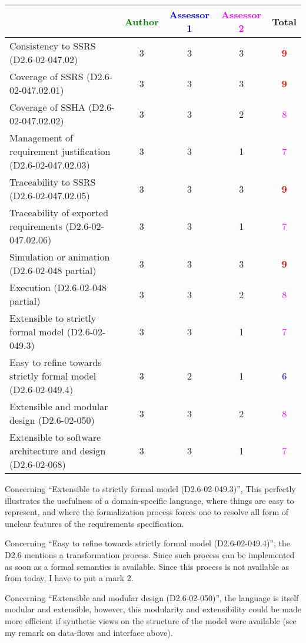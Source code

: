 \begin{tabular}{|l | c | c | c | c|}
\hline
& \textcolor{green}{Author} & \textcolor{blue}{Assessor 1} & \textcolor{magenta}{Assessor 2} & Total \\
\hline 
Consistency to SSRS (D2.6-02-047.02) & 3     & 3     & 3     & \textcolor{red}{\textbf{9}} \\
\hline
Coverage of SSRS (D2.6-02-047.02.01)  & 3     & 3     & 3     & \textcolor{red}{\textbf{9}} \\
\hline
Coverage of SSHA (D2.6-02-047.02.02)  & 3     & 3     & 2     & \textcolor{magenta}{8}  \\
\hline
Management of requirement justification (D2.6-02-047.02.03)  & 3     & 3     & 1     & \textcolor{magenta}{7}  \\
\hline
Traceability to  SSRS (D2.6-02-047.02.05)  & 3     & 3     & 3     & \textcolor{red}{\textbf{9}}  \\
\hline
Traceability of exported requirements (D2.6-02-047.02.06)  & 3     & 3     & 1     & \textcolor{magenta}{7}  \\
\hline
Simulation or animation (D2.6-02-048 partial)  & 3     & 3     & 3     & \textcolor{red}{\textbf{9}}  \\
\hline
Execution (D2.6-02-048 partial)  & 3     & 3     & 2     & \textcolor{magenta}{8}  \\
\hline
Extensible to strictly formal model (D2.6-02-049.3) & 3     & 3     & 1     & \textcolor{magenta}{7} \\
\hline
Easy to refine towards strictly formal model (D2.6-02-049.4) & 3     & 2     & 1     & \textcolor{blue}{6}  \\
\hline
Extensible and modular design (D2.6-02-050)  & 3     & 3     & 2     & \textcolor{magenta}{8}  \\
\hline
Extensible to software architecture and design (D2.6-02-068)   & 3     & 3     & 1     & \textcolor{magenta}{7}  \\
\hline
\end{tabular}


\begin{assessor1}
Concerning "`Extensible to strictly formal model (D2.6-02-049.3)"', This perfectly illustrates the usefulness of a domain-specific language, where things are easy to represent, and where the formalization process forces one to resolve all form of unclear features of the requirements specification. 

Concerning "`Easy to refine towards strictly formal model (D2.6-02-049.4)"', the D2.6 mentions a transformation process. Since such process can be implemented as soon as a formal semantics is available. Since this process is not available as from today, I have to put a mark 2. 

Concerning "`Extensible and modular design (D2.6-02-050)"', the language is itself modular and extensible, however, this modularity and extensibility could be made more efficient if synthetic views on the structure of the model were available (see my remark on data-flows and interface above). 
\end{assessor1}

